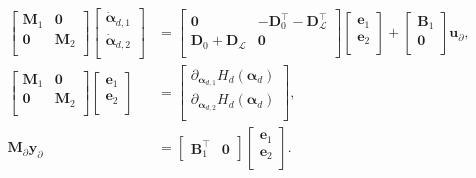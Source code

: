 \begin{equation}\label{eq:pHsys_findim_J1}
\begin{aligned}
\begin{bmatrix}
\mathbf{M}_1 & \mathbf{0} \\
\mathbf{0} & \mathbf{M}_2 \\
\end{bmatrix}
\begin{bmatrix}
\dot{\bm{\alpha}}_{d, 1} \\
\dot{\bm{\alpha}}_{d, 2} \\
\end{bmatrix}
&= \begin{bmatrix}
\mathbf{0} & -\mathbf{D}_{0}^\top - \mathbf{D}_{\mathcal{L}}^\top \\
\mathbf{D}_{0} + \mathbf{D}_{\mathcal{L}} & \mathbf{0} \\
\end{bmatrix} 
\begin{bmatrix}
\mathbf{e}_{1} \\
\mathbf{e}_{2} \\
\end{bmatrix} + 
\begin{bmatrix}
\mathbf{B}_1\\
\mathbf{0}\\
\end{bmatrix}
\mathbf{u}_\partial, \\
\begin{bmatrix}
\mathbf{M}_1 & \mathbf{0} \\
\mathbf{0} & \mathbf{M}_2 \\
\end{bmatrix}
\begin{bmatrix}
\mathbf{e}_{1} \\
\mathbf{e}_{2} \\
\end{bmatrix}
&= \begin{bmatrix}
\partial_{\bm{\alpha}_{d, 1}} H_d(\bm{\alpha}_d)\\
\partial_{\bm{\alpha}_{d, 2}} H_d(\bm{\alpha}_d)\\
\end{bmatrix}, \\
\mathbf{M}_\partial {\mathbf{y}_\partial} &= \begin{bmatrix}
\mathbf{B}_1^\top & \mathbf{0}
\end{bmatrix}\begin{bmatrix}
\mathbf{e}_{1} \\
\mathbf{e}_{2} \\
\end{bmatrix}.
\end{aligned}
\end{equation}
